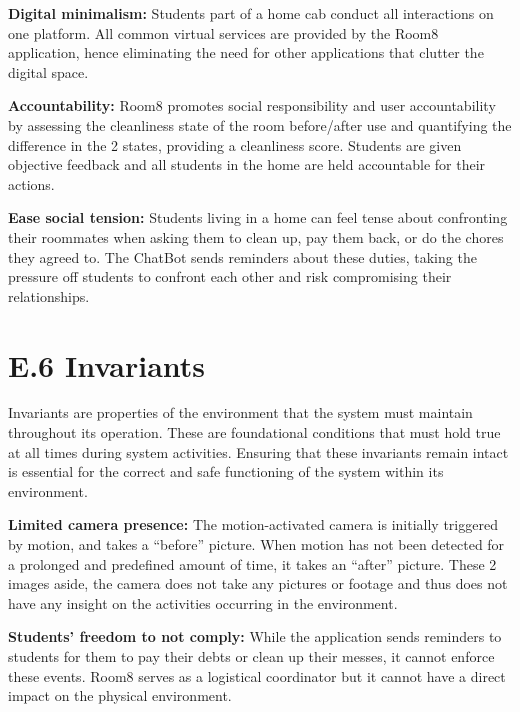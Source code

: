 \documentclass{scrreprt}
\newcommand*{\nsection}[1]{
    \section*{#1}
    \addcontentsline{toc}{section}{#1}
}
\theoremstyle{definition}
\begin{document}
\begin{flushleft}
  \item \textbf{Digital minimalism:} Students part of a home cab conduct all interactions on one platform. All common virtual services are provided by the Room8 application, hence eliminating the need for other applications that clutter the digital space.\newline

  \item \textbf{Accountability:} Room8 promotes social responsibility and user accountability by assessing the cleanliness state of the room before/after use and quantifying the difference in the 2 states, providing a cleanliness score. Students are given objective feedback and all students in the home are held accountable for their actions.\newline
  
  \item \textbf{Ease social tension:} Students living in a home can feel tense about confronting their roommates when asking them to clean up, pay them back, or do the chores they agreed to. The ChatBot sends reminders about these duties, taking the pressure off students to confront each other and risk compromising their relationships.\newline 
\end{flushleft}

\nsection{E.6 Invariants}
Invariants are properties of the environment that the system must maintain throughout its operation. These are foundational conditions that must hold true at all times during system activities. Ensuring that these invariants remain intact is essential for the correct and safe functioning of the system within its environment.
\begin{flushleft}
  \item \textbf{Limited camera presence:} The motion-activated camera is initially triggered by motion, and takes a “before” picture. When motion has not been detected for a prolonged and predefined amount of time, it takes an “after” picture. These 2 images aside, the camera does not take any pictures or footage and thus does not have any insight on the activities occurring in the environment.  
  \newline
  \item \textbf{Students' freedom to not comply:} While the application sends reminders to students for them to pay their debts or clean up their messes, it cannot enforce these events. Room8 serves as a logistical coordinator but it cannot have a direct impact on the physical environment.
  \newline
\end{flushleft}
\end{document}
